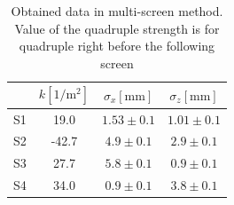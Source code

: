 \documentclass[12pt]{article}
\begin{document}
\begin{table}[H]
    \centering
    \begin{tabular}{c|c|c|c}
    \hline
    \hline
       & $k \mathrm{[1/m^2]}$& $\sigma_x \mathrm{[mm]}$ & $\sigma_z \mathrm{[mm]}$ \\
   \hline
        S1 & 19.0 & $1.53 \pm 0.1$ & $1.01 \pm 0.1$ \\
        S2 & -42.7& $4.9 \pm 0.1$& $2.9 \pm 0.1$\\
        S3 & 27.7 & $5.8 \pm 0.1$& $0.9 \pm 0.1$\\
        S4 & 34.0 & $0.9 \pm 0.1$& $3.8 \pm 0.1$\\
        \hline
    \end{tabular}
    \caption{Obtained data in multi-screen method. Value of the quadruple strength is for quadruple right before the following screen}
    \label{multrow}
\end{table}
\end{document}
